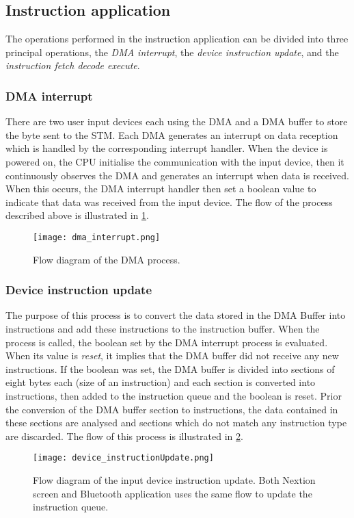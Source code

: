 \subsection{Instruction application}
The operations performed in the instruction application can be divided into three principal operations, the \textit{DMA interrupt}, the \textit{device instruction update}, and the \textit{instruction fetch decode execute}.
\subsubsection{DMA interrupt}
There are two user input devices each using the DMA and a DMA buffer to store the byte sent to the STM. Each DMA generates an interrupt on data reception which is handled by the corresponding interrupt handler. When the device is powered on, the CPU initialise the communication with the input device, then it continuously observes the DMA and generates an interrupt when data is received. When this occurs, the DMA interrupt handler then set a boolean value to indicate that data was received from the input device. The flow of the process described above is illustrated in \cref{fig:dma_interrupt}. 
\begin{figure}[ht]
\centering
\texttt{[image: dma\_interrupt.png]}
\caption{Flow diagram of the DMA process.}
\label{fig:dma_interrupt}
\end{figure}

\subsubsection{Device instruction update}
The purpose of this process is to convert the data stored in the DMA Buffer into instructions and add these instructions to the instruction buffer. When the process is called, the boolean set by the DMA interrupt process is evaluated. When its value is \textit{reset}, it implies that the DMA buffer did not receive any new instructions. If the boolean was set, the DMA buffer is divided into sections of eight bytes each (size of an instruction) and each section is converted into instructions, then added to the instruction queue and the boolean is reset. Prior the conversion of the DMA buffer section to instructions, the data contained in these sections are analysed and sections which do not match any instruction type are discarded. The flow of this process is illustrated in \cref{fig:device_instructionUpdate}. 
\begin{figure}[ht]
\centering
\texttt{[image: device\_instructionUpdate.png]}
\caption{Flow diagram of the input device instruction update. Both Nextion screen and Bluetooth application uses the same flow to update the instruction queue.}
\label{fig:device_instructionUpdate}
\end{figure}

